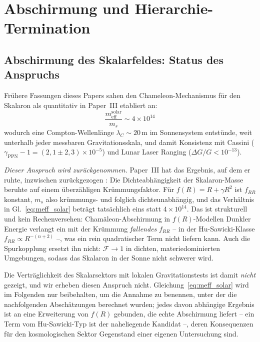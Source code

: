 \documentclass[aps,prd,twocolumn,superscriptaddress,nofootinbib]{revtex4-2}
\begin{document}
\section{Abschirmung und Hierarchie-Termination}
\label{sec:screening}

\subsection{Abschirmung des Skalarfeldes: Status des Anspruchs}
\label{sec:scalar_screening_status}

Fr\"uhere Fassungen dieses Papers sahen den Chameleon-Mechanismus f\"ur den Skalaron als quantitativ in Paper~III etabliert an:
\begin{equation}
\frac{m_{\mathrm{eff}}^{\mathrm{solar}}}{m_s} \sim 4 \times 10^{14}
\label{eq:meff_solar}
\end{equation}
wodurch eine Compton-Wellenl\"ange $\lambda_C \sim 20$\,m im Sonnensystem entst\"unde, weit unterhalb jeder messbaren Gravitationsskala, und damit Konsistenz mit Cassini ($\gamma_{\mathrm{PPN}} - 1 = (2{,}1 \pm 2{,}3) \times 10^{-5}$) \cite{Bertotti2003} und Lunar Laser Ranging ($\Delta G/G < 10^{-13}$).

\textit{Dieser Anspruch wird zur\"uckgenommen.} Paper~III hat das Ergebnis, auf dem er ruhte, inzwischen zur\"uckgezogen \cite{Geiger2026c}: Die Dichteabh\"angigkeit der Skalaron-Masse beruhte auf einem \"uberz\"ahligen Kr\"ummungsfaktor. F\"ur $f(R) = R + \gamma R^2$ ist $f_{RR}$ konstant, $m_s$ also kr\"ummungs- und folglich dichteunabh\"angig, und das Verh\"altnis in Gl.~\eqref{eq:meff_solar} betr\"agt tats\"achlich eins statt $4 \times 10^{14}$. Das ist strukturell und kein Rechenversehen: Cham\"aleon-Abschirmung in $f(R)$-Modellen Dunkler Energie verlangt ein mit der Kr\"ummung \textit{fallendes} $f_{RR}$ -- in der Hu-Sawicki-Klasse $f_{RR} \propto R^{-(n+2)}$ \cite{HuSawicki2007} --, was ein rein quadratischer Term nicht liefern kann. Auch die Spurkopplung ersetzt ihn nicht: $\mathcal{F} \to 1$ in dichten, materiedominierten Umgebungen, sodass das Skalaron in der Sonne nicht schwerer wird.

Die Vertr\"aglichkeit des Skalarsektors mit lokalen Gravitationstests ist damit \textit{nicht} gezeigt, und wir erheben diesen Anspruch nicht. Gleichung~\eqref{eq:meff_solar} wird im Folgenden nur beibehalten, um die Annahme zu benennen, unter der die nachfolgenden Absch\"atzungen berechnet wurden; jedes davon abh\"angige Ergebnis ist an eine Erweiterung von $f(R)$ gebunden, die echte Abschirmung liefert -- ein Term vom Hu-Sawicki-Typ ist der naheliegende Kandidat --, deren Konsequenzen f\"ur den kosmologischen Sektor Gegenstand einer eigenen Untersuchung sind.
\end{document}

